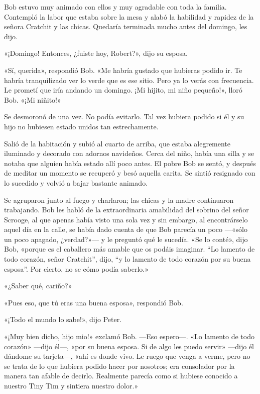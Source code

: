 \documentclass{novela}
\begin{document}
 Bob estuvo muy animado con ellos y muy agradable con toda la familia. Contempló la labor que estaba sobre la mesa y alabó la habilidad y rapidez de la señora Cratchit y las chicas. Quedaría terminada mucho antes del domingo, les dijo.

 «¡Domingo! Entonces, ¿fuiste hoy, Robert?», dijo su esposa.

 «Sí, querida», respondió Bob. «Me habría gustado que hubieras podido ir. Te habría tranquilizado ver lo verde que es ese sitio. Pero ya lo verás con frecuencia. Le prometí que iría andando un domingo. ¡Mi hijito, mi niño pequeño!», lloró Bob. «¡Mi niñito!»

 Se desmoronó de una vez. No podía evitarlo. Tal vez hubiera podido si él y su hijo no hubiesen estado unidos tan estrechamente.

 Salió de la habitación y subió al cuarto de arriba, que estaba alegremente iluminado y decorado con adornos navideños. Cerca del niño, había una silla y se notaba que alguien había estado allí poco antes. El pobre Bob se sentó, y después de meditar un momento se recuperó y besó aquella carita. Se sintió resignado con lo sucedido y volvió a bajar bastante animado.

 Se agruparon junto al fuego y charlaron; las chicas y la madre continuaron trabajando. Bob les habló de la extraordinaria amabilidad del sobrino del señor Scrooge, al que apenas había visto una sola vez y sin embargo, al encontrárselo aquel día en la calle, se había dado cuenta de que Bob parecía un poco ---«sólo un poco apagado, ¿verdad?»--- y le preguntó qué le sucedía. «Se lo conté», dijo Bob, «porque es el caballero más amable que os podáis imaginar. “Lo lamento de todo corazón, señor Cratchit”, dijo, “y lo lamento de todo corazón por su buena esposa”. Por cierto, no se cómo podía saberlo.»

 «¿Saber qué, cariño?»

 «Pues eso, que tú eras una buena esposa», respondió Bob.

 «¡Todo el mundo lo sabe!», dijo Peter.

 «¡Muy bien dicho, hijo mio!» exclamó Bob. ---Eso espero---. «Lo lamento de todo corazón» ---dijo él---, «por su buena esposa. Si de algo les puedo servir» ---dijo él dándome su tarjeta---, «ahí es donde vivo. Le ruego que venga a verme, pero no se trata de lo que hubiera podido hacer por nosotros; era consolador por la manera tan afable de decirlo. Realmente parecía como si hubiese conocido a nuestro Tiny Tim y sintiera nuestro dolor.»
\end{document}
